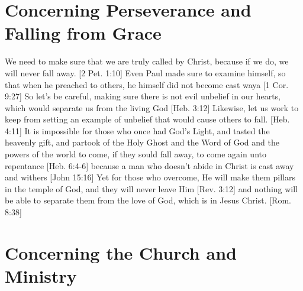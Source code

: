 \documentclass[../main.tex]{subfiles}
\begin{document}
	\section{Concerning Perseverance and Falling from Grace}

	We need to make sure that we are truly called by Christ, because if we do, we will never fall away. [2 Pet. 1:10] Even Paul made sure to examine himself, so that when he preached to others, he himself did not become cast waya [1 Cor. 9:27] So let's be careful, making sure there is not evil unbelief in our hearts, which would separate us from the living God [Heb. 3:12] Likewise, let us work to keep from setting an example of unbelief that would cause others to fall. [Heb. 4:11] It is impossible for those who once had God's Light, and tasted the heavenly gift, and partook of the Holy Ghost and the Word of God and the powers of the world to come, if they sould fall away, to come again unto repentance [Heb. 6:4-6] because a man who doesn't abide in Christ is cast away and withers [John 15:16] Yet for those who overcome, He will make them pillars in the temple of God, and they will never leave Him [Rev. 3:12] and nothing will be able to separate them from the love of God, which is in Jesus Christ. [Rom. 8:38]

	\section{Concerning the Church and Ministry}
\end{document}
